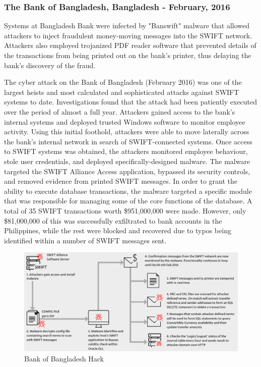 \documentclass[12pt]{article}
\begin{document}
    \subsubsection{The Bank of Bangladesh, Bangladesh - February, 2016}
        
        Systems at Bangladesh Bank were infected by "Banswift" malware that allowed attackers to inject fraudulent money-moving messages into the SWIFT network. Attackers also employed trojanized PDF reader software that prevented details of the transactions from being printed out on the bank's printer, thus delaying the bank's discovery of the fraud.
        
        The cyber attack on the Bank of Bangladesh (February 2016) was one of the largest heists and most calculated and sophisticated attacks against SWIFT systems to date. Investigations found that the attack had been patiently executed over the period of almost a full year. Attackers gained access to the bank’s internal systems and deployed trusted Windows software to monitor employee activity. Using this initial foothold, attackers were able to move laterally across the bank’s internal network in search of SWIFT-connected systems. Once access to SWIFT systems was obtained, the attackers monitored employee behaviour, stole user credentials, and deployed specifically-designed malware. The malware targeted the SWIFT Alliance Access application, bypassed its security controls, and removed evidence from printed SWIFT messages.
        In order to grant the ability to execute database transactions, the malware targeted a specific module that was responsible for managing some of the core functions of the database.
        A total of 35 SWIFT transactions worth \$951,000,000 were made. However, only \$81,000,000 of this was successfully exfiltrated to bank accounts in the Philippines, while the rest were blocked and recovered due to typos being identified within a number of SWIFT messages sent.
        
        \begin{figure}[H]
        \centering
        \includegraphics[width=\textwidth]{figures/Bangladesh.png}
        \caption{Bank of Bangladesh Hack}
        \label{fig:Bangladesh}
        \end{figure}
        
\end{document}
